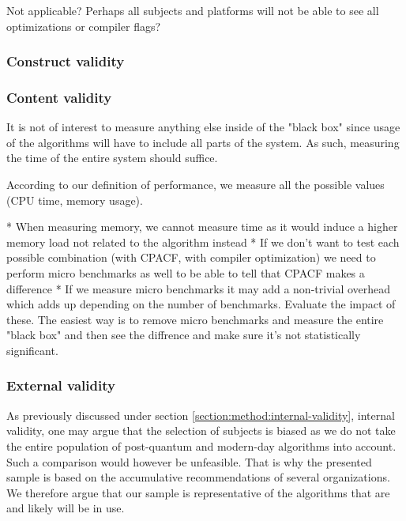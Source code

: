 

Not applicable?
Perhaps all subjects and platforms will not be able to see all optimizations or compiler flags?

\subsubsection{Construct validity}

\subsubsection{Content validity}


It is not of interest to measure anything else inside of the "black box" since usage of the algorithms will have to include all parts of the system. As such, measuring the time of the entire system should suffice.

According to our definition of performance, we measure all the possible values (CPU time, memory usage).

* When measuring memory, we cannot measure time as it would induce a higher memory load not related to the algorithm instead
* If we don't want to test each possible combination (with CPACF, with compiler optimization) we need to perform micro benchmarks as well to be able to tell that CPACF makes a difference
* If we measure micro benchmarks it may add a non-trivial overhead which adds up depending on the number of benchmarks. Evaluate the impact of these. The easiest way is to remove micro benchmarks and measure the entire "black box" and then see the diffrence and make sure it's not statistically significant.

\subsubsection{External validity}

As previously discussed under section \ref{section:method:internal-validity}, internal validity, one may argue that the selection of subjects is biased as we do not take the entire population of post-quantum and modern-day algorithms into account. Such a comparison would however be unfeasible. That is why the presented sample is based on the accumulative recommendations of several organizations. We therefore argue that our sample is representative of the algorithms that are and likely will be in use.

